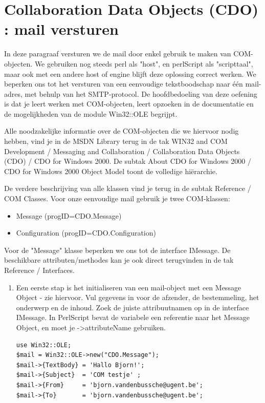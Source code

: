 \documentclass[11pt,a4paper]{report}
\begin{document}
\section{Collaboration Data Objects (CDO) : mail versturen}
In deze paragraaf versturen we de mail door enkel gebruik te maken van COM-objecten. We gebruiken nog steeds perl als "host", en perlScript als "scripttaal", maar ook met een andere host of engine blijft deze oplossing correct werken. We beperken ons tot het versturen van een eenvoudige tekstboodschap naar één mail-adres, met behulp van het SMTP-protocol.
De hoofdbedoeling van deze oefening is dat je leert werken met COM-objecten, leert opzoeken in de documentatie en de mogelijkheden van de module Win32::OLE begrijpt.
\par Alle noodzakelijke informatie over de COM-objecten die we hiervoor nodig hebben, vind je in de MSDN Library terug in de tak WIN32 and COM Development / Messaging and Collaboration / Collaboration Data Objects (CDO) / CDO for Windows 2000.
De subtak About CDO for Windows 2000 / CDO for Windows 2000 Object Model toont de volledige hiërarchie.
\par De verdere beschrijving van alle klassen vind je terug in de subtak Reference / COM Classes. Voor onze eenvoudige mail gebruik je twee COM-klassen:
\begin{itemize}
	\item Message (progID=CDO.Message)
	\item Configuration (progID=CDO.Configuration)
\end{itemize}
\par Voor de "Message" klasse beperken we ons tot de interface IMessage. De beschikbare attributen/methodes kan je ook direct terugvinden in de tak Reference / Interfaces.
\begin{enumerate}[resume]
	\item Een eerste stap is het initialiseren van een mail-object met een Message Object - zie hiervoor. Vul gegevens in voor de afzender, de bestemmeling, het onderwerp en de inhoud. Zoek de juiste attribuutnamen op in de interface IMessage. In PerlScript bevat de variabele een referentie naar het Message Object, en moet je ->{attributeName} gebruiken.
\begin{lstlisting}
use Win32::OLE;
$mail = Win32::OLE->new("CDO.Message");
$mail->{TextBody} = 'Hallo Bjorn!';
$mail->{Subject}  = 'COM testje' ;
$mail->{From}     = 'bjorn.vandenbussche@ugent.be';
$mail->{To}       = 'bjorn.vandenbussche@ugent.be';  
\end{lstlisting}
\end{enumerate}
\end{document}
